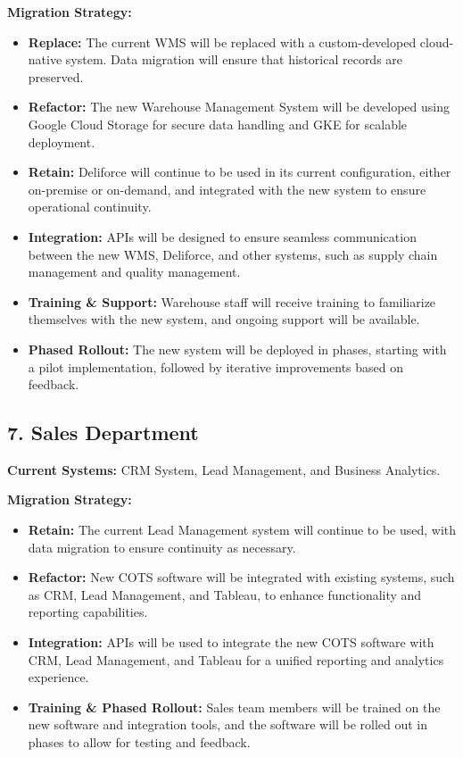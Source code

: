 \textbf{Migration Strategy:}
\begin{itemize}
    \item \textbf{Replace:} The current WMS will be replaced with a custom-developed cloud-native system. Data migration will ensure that historical records are preserved.
    \item \textbf{Refactor:} The new Warehouse Management System will be developed using Google Cloud Storage for secure data handling and GKE for scalable deployment.
    \item \textbf{Retain:} Deliforce will continue to be used in its current configuration, either on-premise or on-demand, and integrated with the new system to ensure operational continuity.
    \item \textbf{Integration:} APIs will be designed to ensure seamless communication between the new WMS, Deliforce, and other systems, such as supply chain management and quality management.
    \item \textbf{Training \& Support:} Warehouse staff will receive training to familiarize themselves with the new system, and ongoing support will be available.
    \item \textbf{Phased Rollout:} The new system will be deployed in phases, starting with a pilot implementation, followed by iterative improvements based on feedback.
\end{itemize}

\subsection{7. Sales Department} 
\textbf{Current Systems:} CRM System, Lead Management, and Business Analytics.

\textbf{Migration Strategy:}
\begin{itemize}
    \item \textbf{Retain:} The current Lead Management system will continue to be used, with data migration to ensure continuity as necessary.
    \item \textbf{Refactor:} New COTS software will be integrated with existing systems, such as CRM, Lead Management, and Tableau, to enhance functionality and reporting capabilities.
    \item \textbf{Integration:} APIs will be used to integrate the new COTS software with CRM, Lead Management, and Tableau for a unified reporting and analytics experience.
    \item \textbf{Training \& Phased Rollout:} Sales team members will be trained on the new software and integration tools, and the software will be rolled out in phases to allow for testing and feedback.
\end{itemize}

